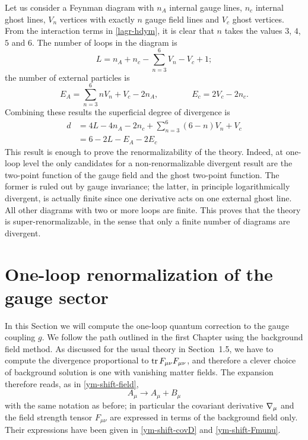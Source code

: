 Let us consider a  Feynman diagram with $n_A$ internal gauge lines, $n_c$ internal ghost lines, $V_n$ vertices with exactly $n$ gauge field lines and $V_c$ ghost vertices. From the interaction terms in \eqref{lagr-hdym}, it is clear that  $n$ takes the values $3$, $4$, $5$ and $6$. 
The number of loops in the diagram is 
\begin{equation}
L = n_A + n_c - \sum_{n=3}^6 V_n - V_c + 1;
\end{equation}
the number of external particles is
\begin{equation}
E_A
	=
\sum_{n=3}^6 n V_n + V_c - 2n_A,
\hspace{4em}
E_c
	=
2V_c - 2n_c.
\end{equation}
Combining these results the superficial degree of divergence is
\begin{equation}
\begin{split}
d 
	& =
4L - 4n_A - 2 n_c + \sum_{n=3}^6 (6-n) V_n + V_c
\\
	& =
6 - 2L - E_A - 2E_c
\end{split}
\end{equation}
This result is enough to prove the renormalizability of the theory. Indeed, at one-loop level the only candidates for a non-renormalizable divergent result are the two-point function of the gauge field and the ghost two-point function. The former is ruled out by gauge invariance; the latter, in principle logarithmically divergent, is actually finite since one derivative acts on one external ghost line.
All other diagrams with two or more loops are finite. This proves that the theory is super-renormalizable, in the sense that only a finite number of diagrams are divergent.





\section{One-loop renormalization of the gauge sector}



In this Section we will compute the one-loop quantum correction to the gauge coupling $g$. We follow the path outlined in the first Chapter using the background field method. As discussed for the usual \ym{} theory in Section~1.5, we have to compute the divergence proportional to $\operatorname{tr} F_{\mu\nu} F_{\mu\nu} $, and therefore a clever choice of background solution is one with vanishing matter fields. The expansion therefore reads, as in \eqref{ym-shift-field},
\begin{equation}
	A_\mu \rightarrow A_\mu + B_\mu 
\end{equation}
with the same notation as before; in particular the covariant derivative ${ \mathcal{\nabla} }_\mu$ and the field strength tensor $F_{\mu\nu}$ are expressed in terms of the background field only. Their expressions have been given in \eqref{ym-shift-covD} and \eqref{ym-shift-Fmunu}.






